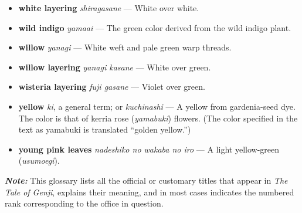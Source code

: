 \documentclass{article}
\begin{document}
\begin{multicols}{3}
\begin{footnotesize}
\begin{itemize}[
			label=,
			leftmargin=0em,
			rightmargin=-1.5em,
			itemindent=-2em,
			nosep,
		]
		\item \textbf{white layering} \textit{shiragasane} --- White over white.

		\item \textbf{wild indigo} \textit{yamaai} --- The green color derived from the wild indigo plant.

		\item \textbf{willow} \textit{yanagi} --- White weft and pale green warp threads.

		\item \textbf{willow layering} \textit{yanagi kasane} --- White over green.

		\item \textbf{wisteria layering} \textit{fuji gasane} --- Violet over green.

		\item \textbf{yellow} \textit{ki}, a general term; or \textit{kuchinashi} --- A yellow from gardenia-seed dye. The color is that of kerria rose (\textit{yamabuki}) flowers. (The color specified in the text as yamabuki is translated “golden yellow.”)

		\item \textbf{young pink leaves} \textit{nadeshiko no wakaba no iro} --- A light yellow-green (\textit{usumoegi}).




	\end{itemize}


	\end{footnotesize}

\end{multicols}

\clearpage



\noindent \textbf{\textit{Note:}} This glossary lists all the official or customary titles that appear in \textit{The Tale of Genji}, explains their meaning, and in most cases indicates the numbered rank corresponding to the office in question.
\end{document}

